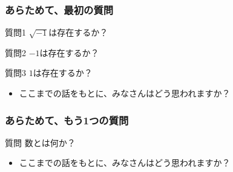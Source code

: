 \documentclass[dvipdfmx]{beamer}
\begin{document}
  \begin{frame}
    \frametitle{あらためて、最初の質問}

    \begin{block}{質問1}
      $\sqrt{-1}$は存在するか？
    \end{block}

    \begin{block}{質問2}
      $-1$は存在するか？
    \end{block}

    \begin{block}{質問3}
      $1$は存在するか？
    \end{block}

    \begin{itemize}
      \item ここまでの話をもとに、みなさんはどう思われますか？
    \end{itemize}

  \end{frame}

  \begin{frame}
    \frametitle{あらためて、もう1つの質問}

    \begin{block}{質問}
      数とは何か？
    \end{block}

    \begin{itemize}
      \item ここまでの話をもとに、みなさんはどう思われますか？
    \end{itemize}

  \end{frame}
\end{document}
